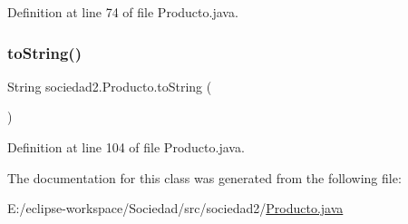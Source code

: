 Definition at line 74 of file Producto.\+java.

\mbox{\label{classsociedad2_1_1_producto_ae19a8691f8a521ff9eb183083f9ff6f4}} 
\subsubsection{\texorpdfstring{to\+String()}{toString()}}
{\footnotesize\ttfamily String sociedad2.\+Producto.\+to\+String (\begin{DoxyParamCaption}{ }\end{DoxyParamCaption})}



Definition at line 104 of file Producto.\+java.



The documentation for this class was generated from the following file\+:\begin{DoxyCompactItemize}
\item 
E\+:/eclipse-\/workspace/\+Sociedad/src/sociedad2/\mbox{\hyperlink{_producto_8java}{Producto.\+java}}\end{DoxyCompactItemize}

